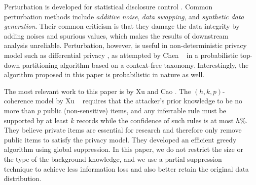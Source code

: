 
Perturbation is developed for statistical disclosure control
\cite{FungWCY10:Survey}. Common perturbation methods include
{\em additive noise}, {\em data swapping}, and {\em synthetic data generation}.
Their common criticism is that they damage the data integrity by adding
noises and spurious values, which makes the results of downstream analysis
unreliable. Perturbation, however, is useful in non-deterministic privacy
model such as differential privacy \cite{Dwork:2006:diff, Dwork08:diff:survey},
as attempted by Chen \etal~ \cite{ChenMFDX11:Diff} in a probabilistic
top-down partitioning algorithm based on a context-free taxonomy.
Interestingly, the algorithm proposed in this paper is probabilistic
in nature as well.

The most relevant work to this paper is by Xu \etal \cite{Xu:2008:ATD}
and Cao \etal \cite{Cao:2010:rho}.
The $(h,k,p)$-coherence model by Xu \etal~ requires that the attacker's
prior knowledge to be no more than $p$ public (non-sensitive) items,
and any inferrable rule must be supported by at least $k$ records
while the confidence of such rules is at most $h$\%.
They believe private items are essential for research and
therefore only remove public items to satisfy the privacy model.
They developed an efficient greedy algorithm using global suppression.
In this paper, we do not restrict the size or the type
of the background knowledge, and we use a partial suppression technique
to achieve less information loss and also better retain the original
data distribution.
%

